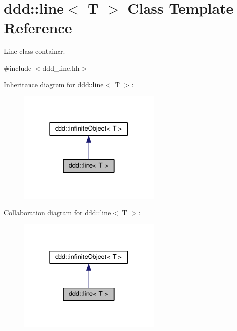 \hypertarget{classddd_1_1line}{}\section{ddd\+:\+:line$<$ T $>$ Class Template Reference}
\label{classddd_1_1line}


Line class container.  




{\ttfamily \#include $<$ddd\+\_\+line.\+hh$>$}



Inheritance diagram for ddd\+:\+:line$<$ T $>$\+:\nopagebreak
\begin{figure}[H]
\begin{center}
\leavevmode
\includegraphics[width=199pt]{d3/de5/classddd_1_1line__inherit__graph}
\end{center}
\end{figure}


Collaboration diagram for ddd\+:\+:line$<$ T $>$\+:\nopagebreak
\begin{figure}[H]
\begin{center}
\leavevmode
\includegraphics[width=199pt]{da/d7c/classddd_1_1line__coll__graph}
\end{center}
\end{figure}
